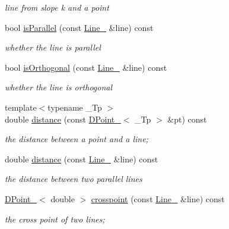 \begin{DoxyCompactItemize}
\begin{DoxyCompactList}\small\item\em line from slope k and a point \end{DoxyCompactList}\item 
bool \hyperlink{classnubot_1_1Line___a3518fa7936f488fe013454c43e40d1b9}{is\-Parallel} (const \hyperlink{classnubot_1_1Line__}{Line\-\_\-} \&line) const 
\begin{DoxyCompactList}\small\item\em whether the line is parallel \end{DoxyCompactList}\item 
bool \hyperlink{classnubot_1_1Line___a824b937e1c6179590b078036e9ea2d87}{is\-Orthogonal} (const \hyperlink{classnubot_1_1Line__}{Line\-\_\-} \&line) const 
\begin{DoxyCompactList}\small\item\em whether the line is orthogonal \end{DoxyCompactList}\item 
{\footnotesize template$<$typename \-\_\-\-Tp $>$ }\\double \hyperlink{classnubot_1_1Line___a2922d374fef598bcc7d12a74a7923e92}{distance} (const \hyperlink{classnubot_1_1DPoint__}{D\-Point\-\_\-}$<$ \-\_\-\-Tp $>$ \&pt) const 
\begin{DoxyCompactList}\small\item\em the distance between a point and a line; \end{DoxyCompactList}\item 
double \hyperlink{classnubot_1_1Line___acaffff55fb8e0e3ec80ecc759ad92052}{distance} (const \hyperlink{classnubot_1_1Line__}{Line\-\_\-} \&line) const 
\begin{DoxyCompactList}\small\item\em the distance between two parallel lines \end{DoxyCompactList}\item 
\hyperlink{classnubot_1_1DPoint__}{D\-Point\-\_\-}$<$ double $>$ \hyperlink{classnubot_1_1Line___a11716bc7ffee70394aeb54fbb6acc1a6}{crosspoint} (const \hyperlink{classnubot_1_1Line__}{Line\-\_\-} \&line) const 
\begin{DoxyCompactList}\small\item\em the cross point of two lines; \end{DoxyCompactList}\end{DoxyCompactItemize}
